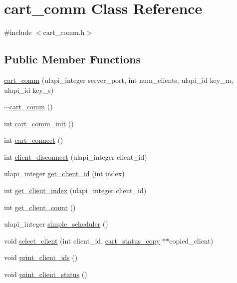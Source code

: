 \hypertarget{classcart__comm}{}\section{cart\+\_\+comm Class Reference}
\label{classcart__comm}


{\ttfamily \#include $<$cart\+\_\+comm.\+h$>$}

\subsection*{Public Member Functions}
\begin{DoxyCompactItemize}
\item 
\hyperlink{classcart__comm_ab336b3d84b33ef32621e083dd4006b67}{cart\+\_\+comm} (ulapi\+\_\+integer server\+\_\+port, int num\+\_\+clients, ulapi\+\_\+id key\+\_\+m, ulapi\+\_\+id key\+\_\+s)
\item 
\hyperlink{classcart__comm_af3b54bc88abece9901b0dc1a535c28f0}{$\sim$cart\+\_\+comm} ()
\item 
int \hyperlink{classcart__comm_a331ab61e71d5f94f413de56737322547}{cart\+\_\+comm\+\_\+init} ()
\item 
int \hyperlink{classcart__comm_a51c43bf924607212e128f75006defed8}{cart\+\_\+connect} ()
\item 
int \hyperlink{classcart__comm_acde9fbf68884955ccfd94a907add2396}{client\+\_\+disconnect} (ulapi\+\_\+integer client\+\_\+id)
\item 
ulapi\+\_\+integer \hyperlink{classcart__comm_a9f5d2a267cb9dd82603cea7656ad57fc}{get\+\_\+client\+\_\+id} (int index)
\item 
int \hyperlink{classcart__comm_a6dcf8cc0eedecebcd436653da2ab680d}{get\+\_\+client\+\_\+index} (ulapi\+\_\+integer client\+\_\+id)
\item 
int \hyperlink{classcart__comm_a33db5a17772cf87452ebdfae4547e152}{get\+\_\+client\+\_\+count} ()
\item 
ulapi\+\_\+integer \hyperlink{classcart__comm_acea9c1ef1278323dd0e387b34c5c8015}{simple\+\_\+scheduler} ()
\item 
void \hyperlink{classcart__comm_a18d4c10fb7af8cb219460461fa5967f5}{select\+\_\+client} (int client\+\_\+id, \hyperlink{classcart__status__copy}{cart\+\_\+status\+\_\+copy} $\ast$$\ast$copied\+\_\+client)
\item 
void \hyperlink{classcart__comm_a00fdba1bcb1d3e7234c83a1b2d692947}{print\+\_\+client\+\_\+ids} ()
\item 
void \hyperlink{classcart__comm_a46b117a719b4844c97b570229c82cbc8}{print\+\_\+client\+\_\+status} ()
$$
\end{DoxyCompactItemize}
